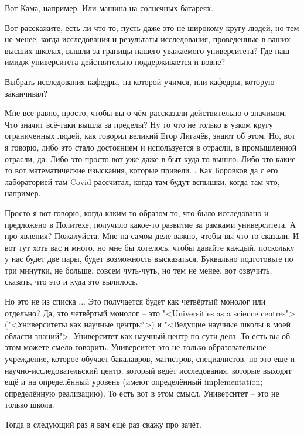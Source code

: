 \documentclass[main.tex]{subfiles}
\begin{document}
Вот Кама, например.
Или машина на солнечных батареях.

Вот расскажите, есть ли что-то, пусть даже это не широкому кругу людей, но тем не менее, когда исследования и результаты исследования, проведенные в ваших высших школах, вышли за границы нашего уважаемого университета?
Где наш имидж университета действительно поддерживается и вовне?

Выбрать исследования кафедры, на которой учимся, или кафедры, которую заканчивал?

Мне все равно, просто, чтобы вы о чём рассказали действительно о значимом.
Что значит всё-таки вышла за пределы?
Ну то что не только в узком кругу ограниченных людей, как говорил великий Егор Лигачёв, знают об этом.
Но, вот я говорю, либо это стало достоянием и используется в отрасли, в промышленной отрасли, да.
Либо это просто вот уже даже в быт куда-то вышло.
Либо это какие-то вот математические изыскания, которые привели...
Как Боровков да с его лабораторией там Covid рассчитал, когда там будут вспышки, когда там что, например.

Просто я вот говорю, когда каким-то образом то, что было исследовано и предложено в Политехе, получило какое-то развитие за рамками университета.
А про явления?
Пожалуйста.
Мне на самом деле важно, чтобы вы что-то сказали.
И вот тут хоть вас и много, но мне бы хотелось, чтобы давайте каждый, поскольку у нас будет две пары, будет возможность высказаться.
Буквально подготовьте по три минутки, не больше, совсем чуть-чуть, но тем не менее, вот озвучить, сказать, что это и куда это вылилось.

Но это не из списка ...
Это получается будет как четвёртый монолог или отдельно?
Да, это четвёртый монолог -- это "<Universities as a science centres"> ("<Университеты как научные центры">) и "<Ведущие научные школы в моей области знаний">.
Университет как научный центр по сути дела.
То есть вы об этом можете смело говорить.
Университет это не только образовательное учреждение, которое обучает бакалавров, магистров, специалистов, но это еще и научно-исследовательский центр, который ведёт исследования, которые выходят ещё и на определённый уровень (имеют определённый implementation; определённую реализацию).
То есть вот в этом смысл.
Университет -- это не только школа.

Тогда в следующий раз я вам ещё раз скажу про зачёт.
\end{document}
